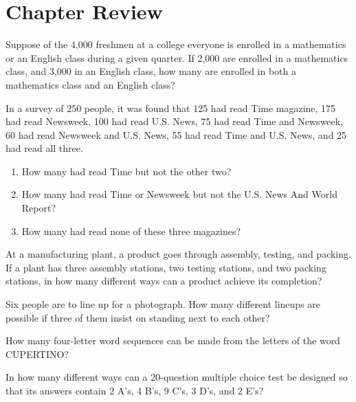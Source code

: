 \section{Chapter Review}

\begin{puzzle}
    Suppose of the 4,000 freshmen at a college everyone is enrolled in a mathematics or an English class during a given quarter. If 2,000 are enrolled in a mathematics class, and 3,000 in an English class, how many are enrolled in both a mathematics class and an English class?
\end{puzzle}

\begin{puzzle}
    In a survey of 250 people, it was found that 125 had read Time magazine, 175 had read Newsweek, 100 had read U.S. News, 75 had read Time and Newsweek, 60 had read Newsweek and U.S. News, 55 had read Time and U.S. News, and 25 had read all three.
    \begin{enumerate}
        \item How many had read Time but not the other two?
        \item How many had read Time or Newsweek but not the U.S. News And World Report?
        \item How many had read none of these three magazines?
    \end{enumerate}
\end{puzzle}

\begin{puzzle}
    At a manufacturing plant, a product goes through assembly, testing, and packing. If a plant has three assembly stations, two testing stations, and two packing stations, in how many different ways can a product achieve its completion?
\end{puzzle}

\begin{puzzle}
    Six people are to line up for a photograph. How many different lineups are possible if three of them insist on standing next to each other?
\end{puzzle}

\begin{puzzle}
    How many four-letter word sequences can be made from the letters of the word CUPERTINO?
\end{puzzle}

\begin{puzzle}
    In how many different ways can a 20-question multiple choice test be designed so that its answers contain 2 A's, 4 B's, 9 C's, 3 D's, and 2 E's?
\end{puzzle}

